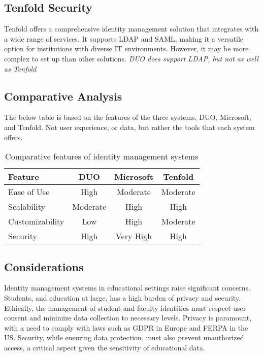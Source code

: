 \documentclass[10pt]{article}
\begin{document}
\subsection{Tenfold Security}
Tenfold offers a comprehensive identity management solution that integrates with
a wide range of services. It supports LDAP and SAML, making it a versatile
option for institutions with diverse IT environments. However, it may be more
complex to set up than other solutions. \textit{DUO does support LDAP, but not
	as well as Tenfold}\cite{tenfold_docs}
{\newpage}

\subsection{Comparative Analysis}
The below table is based on the features of the three systems, DUO, Microsoft,
and Tenfold. Not user experience, or data, but rather the tools that each system
offers.\\

\begin{table}[h]
	\centering
	\begin{tabular}{@{}lccc@{}}
		\toprule
		Feature         & DUO      & Microsoft & Tenfold  \\ \midrule
		Ease of Use     & High     & Moderate  & Moderate \\
		Scalability     & Moderate & High      & High     \\
		Customizability & Low      & High      & Moderate \\
		Security        & High     & Very High & High     \\
		\bottomrule
	\end{tabular}
	\caption{Comparative features of identity management systems}
	\label{tab:comparison}
\end{table}

\subsection{Considerations}
Identity management systems in educational settings raise significant concerns.
Students, and education at large, has a high burden of privacy and security.
Ethically, the management of student and faculty identities must respect user
consent and minimize data collection to necessary levels. Privacy is paramount,
with a need to comply with laws such as GDPR \cite{gdpr-info} in Europe and
FERPA\cite{usdoe_ferpa} in the US. Security, while ensuring data protection, must also prevent
unauthorized access, a critical aspect given the sensitivity of educational
data.
\end{document}
